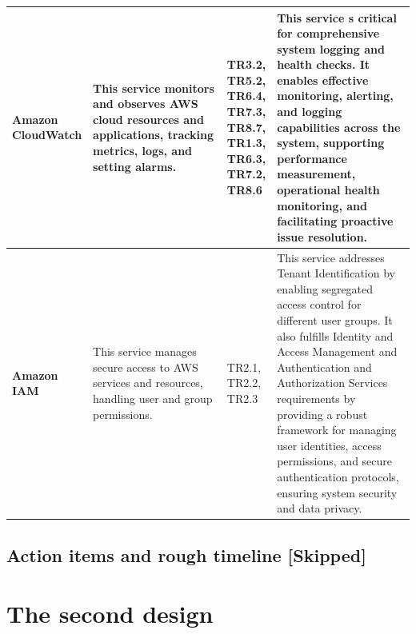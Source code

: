 \documentclass{article}
\begin{document}
\begin{table}[H]
\begin{tabular}{|p{0.1\linewidth}| p{0.4\linewidth} | p{0.1\linewidth} | p{0.4\linewidth} |}
        \textbf{Amazon CloudWatch \cite{cloudwatch}}&  This service monitors and observes AWS cloud resources and applications, tracking metrics, logs, and setting alarms.& TR3.2, TR5.2, TR6.4, TR7.3, TR8.7, TR1.3, TR6.3, TR7.2, TR8.6 & This service s critical for comprehensive system logging and health checks. It enables effective monitoring, alerting, and logging capabilities across the system, supporting performance measurement, operational health monitoring, and facilitating proactive issue resolution. \\ \hline
         
        \textbf{Amazon IAM \cite{iam}} &  This service manages secure access to AWS services and resources, handling user and group permissions.& TR2.1, TR2.2, TR2.3 & This service addresses Tenant Identification by enabling segregated access control for different user groups. It also fulfills Identity and Access Management and Authentication and Authorization Services requirements by providing a robust framework for managing user identities, access permissions, and secure authentication protocols, ensuring system security and data privacy. \\ \hline 
    \end{tabular}
\end{table}
\subsection{Action items and rough timeline \color{red}[Skipped]} 
\newpage
\section{The second design}\label{5}
\end{document}
